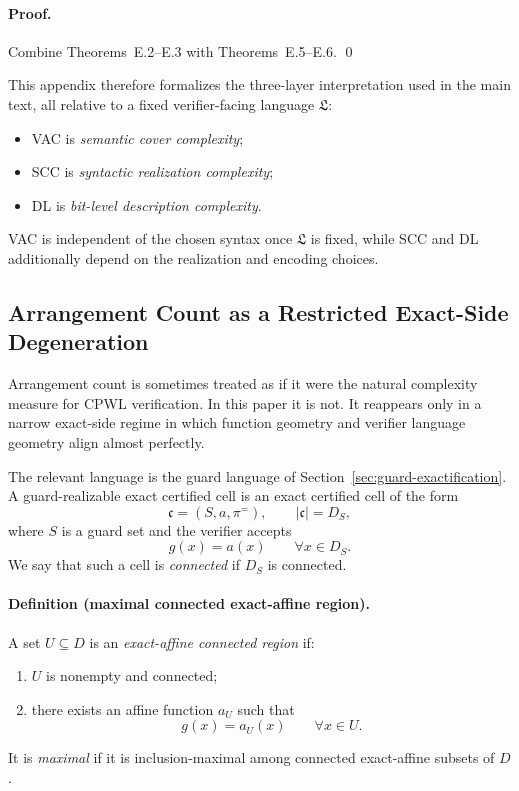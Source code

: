 \paragraph{Proof.}
Combine Theorems~E.2--E.3 with Theorems~E.5--E.6. \qed

This appendix therefore formalizes the three-layer interpretation used in the main text, all relative to a fixed verifier-facing language $\mathfrak L$:
\begin{itemize}
    \item VAC is \emph{semantic cover complexity};
    \item SCC is \emph{syntactic realization complexity};
    \item DL is \emph{bit-level description complexity}.
\end{itemize}
VAC is independent of the chosen syntax once $\mathfrak L$ is fixed, while SCC and DL additionally depend on the realization and encoding choices.

\subsection{Arrangement Count as a Restricted Exact-Side Degeneration}

Arrangement count is sometimes treated as if it were the natural complexity measure for CPWL verification. In this paper it is not. It reappears only in a narrow exact-side regime in which function geometry and verifier language geometry align almost perfectly.

The relevant language is the guard language of Section~\ref{sec:guard-exactification}. A guard-realizable exact certified cell is an exact certified cell of the form
\[
\mathfrak c=(S,a,\pi^{=}),
\qquad
|\mathfrak c|=D_S,
\]
where $S$ is a guard set and the verifier accepts
\[
g(x)=a(x)
\qquad \forall x\in D_S.
\]
We say that such a cell is \emph{connected} if $D_S$ is connected.

\paragraph{Definition (maximal connected exact-affine region).}
A set $U\subseteq D$ is an \emph{exact-affine connected region} if:
\begin{enumerate}
    \item $U$ is nonempty and connected;
    \item there exists an affine function $a_U$ such that
    \[
    g(x)=a_U(x)
    \qquad \forall x\in U.
    \]
\end{enumerate}
It is \emph{maximal} if it is inclusion-maximal among connected exact-affine subsets of $D$.

